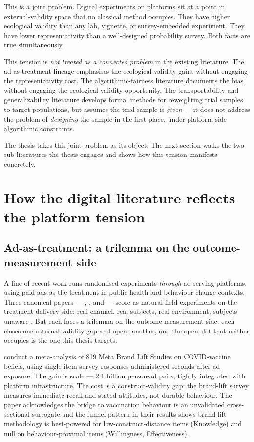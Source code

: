 This is a joint problem. Digital experiments on platforms sit at a point in external-validity space that no classical method occupies. They have higher ecological validity than any lab, vignette, or survey-embedded experiment. They have lower representativity than a well-designed probability survey. Both facts are true simultaneously.

This tension is \emph{not treated as a connected problem} in the existing literature. The ad-as-treatment lineage emphasises the ecological-validity gains without engaging the representativity cost. The algorithmic-fairness literature documents the bias without engaging the ecological-validity opportunity. The transportability and generalizability literature develops formal methods for reweighting trial samples to target populations, but assumes the trial sample is \emph{given} --- it does not address the problem of \emph{designing} the sample in the first place, under platform-side algorithmic constraints.

The thesis takes this joint problem as its object. The next section walks the two sub-literatures the thesis engages and shows how this tension manifests concretely.

\section{How the digital literature reflects the platform tension}
\label{sec:intro:lit}

\subsection{Ad-as-treatment: a trilemma on the outcome-measurement side}
\label{sec:intro:ad-trilemma}

A line of recent work runs randomised experiments \emph{through} ad-serving platforms, using paid ads as the treatment in public-health and behaviour-change contexts. Three canonical papers --- \citet{Athey2023}, \citet{Breza2021}, and \citet{Ho2023} --- score as natural field experiments on the treatment-delivery side: real channel, real subjects, real environment, subjects unaware \citep{Harrison2004}. But each faces a trilemma on the outcome-measurement side: each closes one external-validity gap and opens another, and the open slot that neither occupies is the one this thesis targets.

\citet{Athey2023} conduct a meta-analysis of 819 Meta Brand Lift Studies on COVID-vaccine beliefs, using single-item survey responses administered seconds after ad exposure. The gain is scale --- 2.1 billion person-ad pairs, tightly integrated with platform infrastructure. The cost is a construct-validity gap: the brand-lift survey measures immediate recall and stated attitudes, not durable behaviour. The paper acknowledges the bridge to vaccination behaviour is an unvalidated cross-sectional surrogate and the funnel pattern in their results shows brand-lift methodology is best-powered for low-construct-distance items (Knowledge) and null on behaviour-proximal items (Willingness, Effectiveness).

